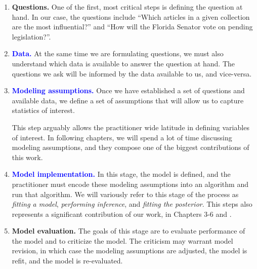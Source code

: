 \begin{enumerate}
\item \textbf{Questions.} One of the first, most critical steps is
  defining the question at hand.  In our case, the questions include
  ``Which articles in a given collection are the most influential?''
  and ``How will the Florida Senator vote on pending legislation?''.

\item \textcolor{blue}{\textbf{Data.}} At the same time we are
  formulating questions, we must also understand which data is
  available to answer the question at hand.  The questions we ask will
  be informed by the data available to us, and vice-versa.

\item \textcolor{blue}{\textbf{Modeling assumptions.}} Once we have
  established a set of questions and available data, we define a set
  of assumptions that will allow us to capture statistics of interest.

  This step arguably allows the practitioner wide latitude in defining
  variables of interest.  In following chapters, we will spend a lot
  of time discussing modeling assumptions, and they compose one of the
  biggest contributions of this work.


  \item \textcolor{blue}{\textbf{Model implementation.}} In this stage, the model is
  defined, and the practitioner must encode these modeling assumptions
  into an algorithm and run that algorithm.  We will variously refer
  to this stage of the process as \emph{fitting a model},
  \emph{performing inference}, and \emph{fitting the posterior}.  This
  steps also represents a significant contribution of our work, in
  Chapters 3-6 and .

  \item \textbf{Model evaluation.} The goals of this stage are to
    evaluate performance of the model and to criticize the model.
    The criticism may warrant model revision, in which case the
    modeling assumptions are adjusted, the model is refit, and the
    model is re-evaluated.


\end{enumerate}
